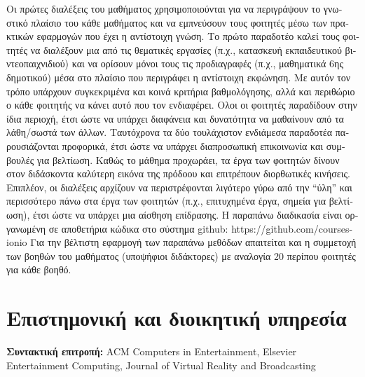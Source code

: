 \documentclass[11pt, a4paper]{article}
\begin{document}
\begin{greek}
Οι πρώτες διαλέξεις του μαθήματος χρησιμοποιούνται για να περιγράψουν το
γνωστικό πλαίσιο του κάθε μαθήματος και να εμπνεύσουν τους φοιτητές μέσω
των πρακτικών εφαρμογών που έχει η αντίστοιχη γνώση. Το πρώτο παραδοτέο
καλεί τους φοιτητές να διαλέξουν μια από τις θεματικές εργασίες (π.χ.,
κατασκευή εκπαιδευτικού βιντεοπαιχνιδιού) και να ορίσουν μόνοι τους τις
προδιαγραφές (π.χ., μαθηματικά 6ης δημοτικού) μέσα στο πλαίσιο που
περιγράφει η αντίστοιχη εκφώνηση. Με αυτόν τον τρόπο υπάρχουν
συγκεκριμένα και κοινά κριτήρια βαθμολόγησης, αλλά και περιθώριο ο κάθε
φοιτητής να κάνει αυτό που τον ενδιαφέρει. Ολοι οι φοιτητές παραδίδουν
στην ίδια περιοχή, έτσι ώστε να υπάρχει διαφάνεια και δυνατότητα να
μαθαίνουν από τα λάθη/σωστά των άλλων. Ταυτόχρονα τα δύο τουλάχιστον
ενδιάμεσα παραδοτέα παρουσιάζονται προφορικά, έτσι ώστε να υπάρχει
διαπροσωπική επικοινωνία και συμβουλές για βελτίωση. Καθώς το μάθημα
προχωράει, τα έργα των φοιτητών δίνουν στον διδάσκοντα καλύτερη εικόνα
της πρόδοου και επιτρέπουν διορθωτικές κινήσεις. Επιπλέον, οι διαλέξεις
αρχίζουν να περιστρέφονται λιγότερο γύρω από την ``ύλη'' και περισσότερο
πάνω στα έργα των φοιτητών (π.χ., επιτυχημένα έργα, σημεία για
βελτίωση), έτσι ώστε να υπάρχει μια αίσθηση επίδρασης. Η παραπάνω
διαδικασία είναι οργανωμένη σε αποθετήρια κώδικα στο σύστημα github:
https://github.com/courses-ionio Για την βέλτιστη εφαρμογή των παραπάνω
μεθόδων απαιτείται και η συμμετοχή των βοηθών του μαθήματος (υποψήφιοι
διδάκτορες) με αναλογία 20 περίπου φοιτητές για κάθε βοηθό.

\hypertarget{ux3b5ux3c0ux3b9ux3c3ux3c4ux3b7ux3bcux3bfux3bdux3b9ux3baux3ae-ux3baux3b1ux3b9-ux3b4ux3b9ux3bfux3b9ux3baux3b7ux3c4ux3b9ux3baux3ae-ux3c5ux3c0ux3b7ux3c1ux3b5ux3c3ux3afux3b1}{%
\section{Επιστημονική και διοικητική
υπηρεσία}\label{ux3b5ux3c0ux3b9ux3c3ux3c4ux3b7ux3bcux3bfux3bdux3b9ux3baux3ae-ux3baux3b1ux3b9-ux3b4ux3b9ux3bfux3b9ux3baux3b7ux3c4ux3b9ux3baux3ae-ux3c5ux3c0ux3b7ux3c1ux3b5ux3c3ux3afux3b1}}

\textbf{Συντακτική επιτροπή:} ACM Computers in Entertainment, Elsevier
Entertainment Computing, Journal of Virtual Reality and Broadcasting


\end{greek}
\end{document}
